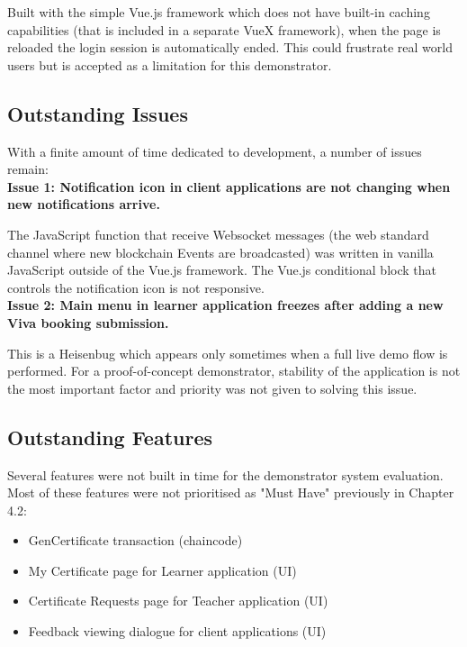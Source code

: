Built with the simple Vue.js framework which does not have built-in caching capabilities 
(that is included in a separate VueX framework), when the page is reloaded the login session 
is automatically ended. This could frustrate real world users but is accepted as a limitation 
for this demonstrator.

\subsection{Outstanding Issues}

With a finite amount of time dedicated to development, a number of issues remain:
\vspace{0.25cm}\\
\textbf{Issue 1: Notification icon in client applications are not changing when new notifications arrive.}

The JavaScript function that receive Websocket messages (the web standard channel where new 
blockchain Events are broadcasted) was written in vanilla JavaScript outside of the Vue.js 
framework. The Vue.js conditional block that controls the notification icon is not responsive.
\vspace{0.25cm}\\
\textbf{Issue 2: Main menu in learner application freezes after adding a new Viva booking submission.}

This is a Heisenbug which appears only sometimes when a full live demo flow is performed. 
For a proof-of-concept demonstrator, stability of the application is not the most important factor 
and priority was not given to solving this issue.

\subsection{Outstanding Features}

Several features were not built in time for the demonstrator system evaluation.
Most of these features were not prioritised as "Must Have" previously in Chapter 4.2:

\begin{itemize}
	\item GenCertificate transaction (chaincode)
	\item My Certificate page for Learner application (UI)
	\item Certificate Requests page for Teacher application (UI)	
	\item Feedback viewing dialogue for client applications (UI)
\end{itemize}

